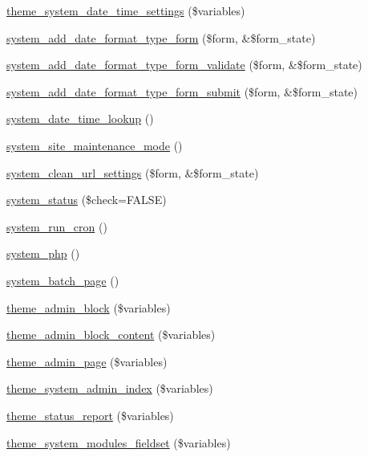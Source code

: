 \begin{DoxyCompactItemize}
\item 
\hyperlink{group__themeable_ga1d104bb4af90ef4212f7fb5c545ded92}{theme\_\-system\_\-date\_\-time\_\-settings} (\$variables)
\item 
\hyperlink{group__forms_ga2f9c33d6203fb7a610b47158e62ed440}{system\_\-add\_\-date\_\-format\_\-type\_\-form} (\$form, \&\$form\_\-state)
\item 
\hyperlink{system_8admin_8inc_a527ad46f9809b020fc60a532b6cdaed9}{system\_\-add\_\-date\_\-format\_\-type\_\-form\_\-validate} (\$form, \&\$form\_\-state)
\item 
\hyperlink{system_8admin_8inc_a190e8dddd57c3106113f5f3836764267}{system\_\-add\_\-date\_\-format\_\-type\_\-form\_\-submit} (\$form, \&\$form\_\-state)
\item 
\hyperlink{system_8admin_8inc_a586fa7e48055bce7f644065259a29a6c}{system\_\-date\_\-time\_\-lookup} ()
\item 
\hyperlink{group__forms_gab7ca2edb8afa1a46eb6f96abda8e2208}{system\_\-site\_\-maintenance\_\-mode} ()
\item 
\hyperlink{group__forms_gacdd318d2c081ec1abcbc496e1c4c06dc}{system\_\-clean\_\-url\_\-settings} (\$form, \&\$form\_\-state)
\item 
\hyperlink{system_8admin_8inc_ad24845c53f23e750918d3b1678bda951}{system\_\-status} (\$check=FALSE)
\item 
\hyperlink{system_8admin_8inc_adf6e4af7e3bed308ad0dd53d1541104a}{system\_\-run\_\-cron} ()
\item 
\hyperlink{system_8admin_8inc_a8b63014dfdc3c9eabbaf62ff9ef456fc}{system\_\-php} ()
\item 
\hyperlink{system_8admin_8inc_a99e35456b673876eff78a38e53673068}{system\_\-batch\_\-page} ()
\item 
\hyperlink{group__themeable_ga8b1a3d4767adfca752cb2d3b92b3f20b}{theme\_\-admin\_\-block} (\$variables)
\item 
\hyperlink{group__themeable_ga464c24771bc0b172bbee22ba7184b65d}{theme\_\-admin\_\-block\_\-content} (\$variables)
\item 
\hyperlink{group__themeable_gaea8c6bf86d9f3e2cb91cca0edfa80d2c}{theme\_\-admin\_\-page} (\$variables)
\item 
\hyperlink{group__themeable_gacd2298d618d9cadea5727104a81ef499}{theme\_\-system\_\-admin\_\-index} (\$variables)
\item 
\hyperlink{group__themeable_gad147c4639b7e85af6e3dcd3dc347366c}{theme\_\-status\_\-report} (\$variables)
\item 
\hyperlink{group__themeable_gaeb3bb95c88bcc506c972e8bc92550ffa}{theme\_\-system\_\-modules\_\-fieldset} (\$variables)

\end{DoxyCompactItemize}
